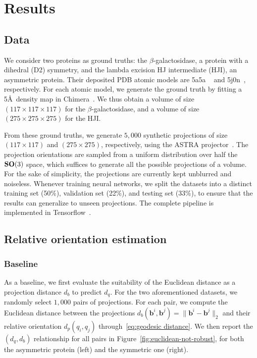 \section{Results}

\subsection{Data}

We consider two proteins as ground truths: the $\beta$-galactosidase, a protein with a dihedral (D2) symmetry, and the lambda excision HJ intermediate (HJI), an asymmetric protein. Their deposited PDB atomic models are 5a5a ~\cite{bartesaghi2015betagal} and 5j0n~\cite{laxmikanthan2016structure}, respectively. For each atomic model, we generate the ground truth by fitting a 5\AA\ density map in Chimera~\cite{pettersen2004ucsf}. We thus obtain a volume of size $(117\times 117\times 117)$ for the $\beta$-galactosidase, and a volume of size $(275\times 275\times 275)$ for the HJI.

From these ground truths, we generate $5,000$ synthetic projections of size $(117\times 117)$ and $(275\times 275)$, respectively, using the ASTRA projector~\cite{van2015astra}. The projection orientations are sampled from a uniform distribution over half the $\mathrm{\mathbf{SO}}(3)$ space, which suffices to generate all the possible projections of a volume. For the sake of simplicity, the projections are currently kept unblurred and noiseless. Whenever training neural networks, we split the datasets into a distinct training set (50\%), validation set (22\%), and testing set (33\%), to ensure that the results can generalize to unseen projections. The complete pipeline is implemented in Tensorflow~\cite{abadi2016tensorflow}.

\subsection{Relative orientation estimation}

\subsubsection{Baseline}

As a baseline, we first evaluate the suitability of the Euclidean distance as a projection distance $d_b$ to predict $d_q$. For the two aforementioned datasets, we randomly select $1,000$ pairs of projections. For each pair, we compute the Euclidean distance between the projections $d_b(\mathbf{b}^i,\mathbf{b}^j)=\lVert\mathbf{b}^i-\mathbf{b}^j\rVert_2$ and their relative orientation $d_p(q_i,q_j)$ through~\eqref{eq:geodesic distance}. We then report the $(d_q,d_b)$ relationship for all pairs in Figure~\ref{fig:euclidean-not-robust}, for both the asymmetric protein (left) and the symmetric one (right).

